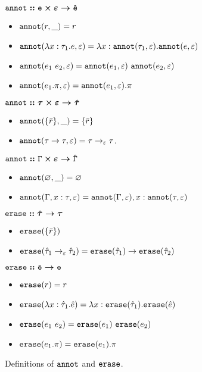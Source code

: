 \begin{figure}[h]
\vspace{-5pt}

$\bm{\mathtt{annot :: e \times \varepsilon \rightarrow \hat e}}$

\begin{itemize}
	\setlength\itemsep{-0.7em}
	\item[] $\mathtt{annot}(r, \_) = r$
	\item[] $\mathtt{annot}(\lambda x: \tau_1 . e, \varepsilon) = \lambda x: \mathtt{annot}(\tau_1, \varepsilon) . \mathtt{annot}(e, \varepsilon)$
	\item[] $\mathtt{annot}(e_1~e_2, \varepsilon) = \mathtt{annot}(e_1, \varepsilon)~\mathtt{annot}(e_2, \varepsilon)$
	\item[] $\mathtt{annot}(e_1.\pi, \varepsilon) = \mathtt{annot}(e_1, \varepsilon).\pi$
\end{itemize}
	
$\bm{\mathtt{annot :: \tau \times \varepsilon \rightarrow \hat \tau}}$

\begin{itemize}
	\setlength\itemsep{-0.7em}
	\item[] $\mathtt{annot}(\{ \bar r \}, \_) = \{ \bar r \}$
	\item[] $\mathtt{annot}(\tau \rightarrow \tau, \varepsilon) = \tau \rightarrow_{\varepsilon} \tau$.	
\end{itemize}

$\bm{\mathtt{annot :: \Gamma \times \varepsilon \rightarrow \hat \Gamma}}$

\begin{itemize}
	\setlength\itemsep{-0.7em}
	\item[] $\mathtt{annot}(\varnothing, \_) = \varnothing$
	\item[] $\mathtt{annot}(\Gamma, x: \tau, \varepsilon) = \mathtt{annot}(\Gamma, \varepsilon), x: \mathtt{annot}(\tau, \varepsilon)$
\end{itemize}

$\bm{\mathtt{erase :: \hat \tau \rightarrow \tau}}$
\begin{itemize}
	\setlength\itemsep{-0.7em}
	\item[] $\mathtt{erase}(\{ \bar r \})$
	\item[] $\mathtt{erase}(\hat \tau_1 \rightarrow_{\varepsilon} \hat \tau_2) = \mathtt{erase}(\hat \tau_1) \rightarrow \mathtt{erase}(\hat \tau_2)$
\end{itemize}

$\bm{\mathtt{erase :: \hat e \rightarrow e}}$
\begin{itemize}
	\setlength\itemsep{-0.7em}
	\item[] $\mathtt{erase}(r) = r$
	\item[] $\mathtt{erase}(\lambda x: \hat \tau_1 . \hat e) = \lambda x: \mathtt{erase}(\hat \tau_1) . \mathtt{erase}(\hat e)$
	\item[] $\mathtt{erase}(e_1~e_2) = \mathtt{erase}(e_1)~\mathtt{erase}(e_2)$
	\item[] $\mathtt{erase}(e_1.\pi) = \mathtt{erase}(e_1).\pi$
\end{itemize}

\vspace{-7pt}
\caption{Definitions of $\mathtt{annot}$ and $\mathtt{erase}$.}
\label{fig:annot_defn}
\end{figure}

